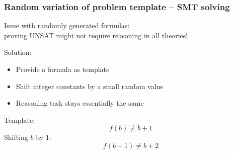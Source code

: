 \documentclass[xcolor={table}]{beamer}
\begin{document}
\begin{frame}
    \frametitle{Random variation of problem template -- SMT solving}

    Issue with randomly generated formulas: \\
    proving UNSAT might not require reasoning in all theories!
    \bigskip

    Solution:
    \begin{itemize}
        \item
            Provide a formula as template
        \item
            Shift integer constants by a small random value
        \item
            Reasoning task stays essentially the same
    \end{itemize}

    \begin{example}
        Template:
        \[ f(b) \neq b+1 \]
        Shifting $b$ by $1$:
        \[ f(b+1) \neq b+2 \]
    \end{example}
\end{frame}


\end{document}
